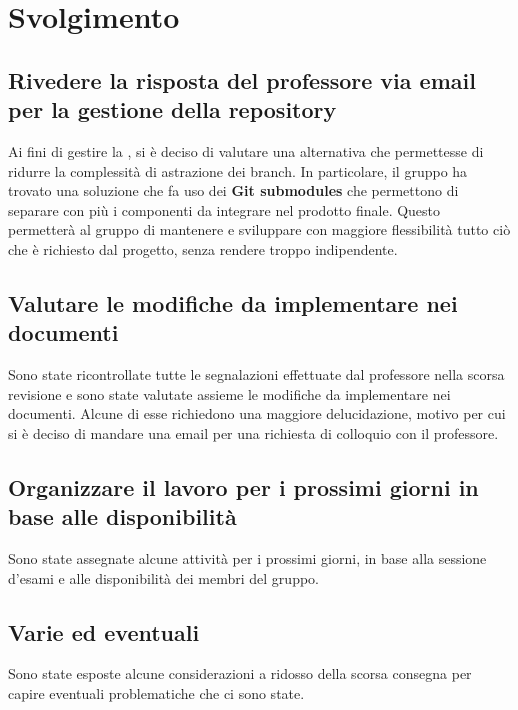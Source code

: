 \newpage
\section*{Svolgimento}

	\subsection*{Rivedere la risposta del professore via email per la gestione della repository}
		Ai fini di gestire la , si è deciso di valutare una alternativa che permettesse di ridurre la complessità di astrazione dei branch. In particolare, il gruppo ha trovato una soluzione che fa uso dei \textbf{Git submodules} che permettono di separare con più  i componenti da integrare nel prodotto finale. Questo permetterà al gruppo di mantenere e sviluppare con maggiore flessibilità tutto ciò che è richiesto dal progetto, senza rendere troppo indipendente.

	\subsection*{Valutare le modifiche da implementare nei documenti}
		Sono state ricontrollate tutte le segnalazioni effettuate dal professore nella scorsa revisione e sono state valutate assieme le modifiche da implementare nei documenti. Alcune di esse richiedono una maggiore delucidazione, motivo per cui si è deciso di mandare una email per una richiesta di colloquio con il professore.

	\subsection*{Organizzare il lavoro per i prossimi giorni in base alle disponibilità}
		Sono state assegnate alcune attività per i prossimi giorni, in base alla sessione d'esami e alle disponibilità dei membri del gruppo.

	\subsection*{Varie ed eventuali}
		Sono state esposte alcune considerazioni a ridosso della scorsa consegna per capire eventuali problematiche che ci sono state.